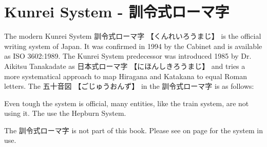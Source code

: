 \section{Kunrei System - 訓令式ローマ字} \label{sec:Kunrei}

The modern Kunrei System {訓令式ローマ字} {【くんれいろうまじ】}  is the
official writing system of Japan. It was confirmed in 1994 by the Cabinet and
is available as ISO 3602:1989. The Kunrei System predecessor was introduced
1985 by Dr. Aikitsu Tanakadate as {日本式ローマ字} {【にほんしきろうまじ】} and
tries a more systematical approach to map Hiragana and Katakana to equal Roman
letters. The {五十音図} {【ごじゅうおんず】} in the {訓令式ローマ字} is as
follows:


Even tough the system is official, many entities, like the train system, are
not using it. The use the Hepburn System.

The {訓令式ローマ字} is not part of this book. Please see 
on page \pageref{sec:Hepburn} for the system in use.
